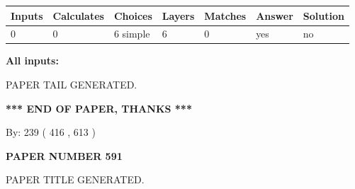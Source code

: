 \documentclass{ctexart}
\begin{document}
 
   
   
   
   
\noindent\begin{tabular}{|l|l|l|l|l|l|l|}
 \hline
Inputs & Calculates & Choices & Layers & Matches & Answer & Solution \\ \hline
 0  & 
 0  & 
 6
  simple  
  & 
 6  & 
 0  & 
  yes & 
  no 
  \\ \hline
 \end{tabular}
   
   
   
   
\noindent{}
   
   
   
   
\noindent\vspace{0.1in}\hspace{-0.08in} {\textbf{\Large{All inputs: }}}
   
   
   
   
   
   
 \vspace{0.2in}
 
   
   
\vspace{2.0in} PAPER TAIL GENERATED.
   
   
   
   
\vspace{1.0in} 
{\textbf{\large{ *** END OF PAPER, THANKS *** }}} 
   
   
\hspace{1.0in} By: 
 239 ( 416 ,  613 )
   
   
   
   
\newpage 
\setcounter{page}{ 
   591001 } 
   
   
   
   
 {\textbf{ \Large{ PAPER NUMBER  591  }}}
   
   
\vspace{0.2in}
   
   
   
   
   
   
   
   
 \vspace{0.2in}
 
 
 
 
   
   
 PAPER TITLE GENERATED.
   
\end{document}
